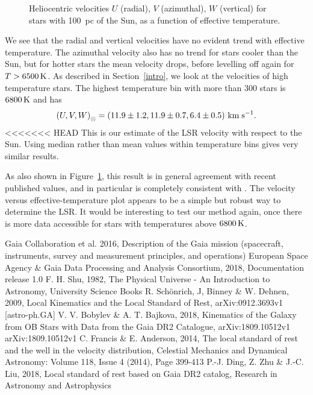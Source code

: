 \documentclass{aastex62}
\begin{document}
	\begin{figure}[ht!]
	\caption{Heliocentric velocities $U$ (radial), $V$ (azimuthal), $W$ (vertical) for stars with 100~pc of the Sun, as a function of effective temperature.\label{fig:lsrmean}}
	\end{figure}

We see that the radial and vertical velocities have no evident trend with effective temperature.  The azimuthal velocity also has no trend for stars cooler than the Sun, but for hotter stars the mean velocity drops, before levelling off again for $T>6500\rm\,K$.  As described in Section~\ref{intro}, we look at the velocities of high temperature stars. The highest temperature bin with more than 300 stars is $6800\rm\,K$ and has
$$ \left( U, V, W\right)_\odot=\left( 11.9\pm1.2, 11.9\pm0.7, 6.4\pm0.5 \right) \rm\,km\;s^{-1}.$$
<<<<<<< HEAD
This is our estimate of the LSR velocity with respect to the Sun.  Using median rather than mean values within temperature bins gives very similar results.

As also shown in Figure~\ref{fig:lsrmean}, this result is in general agreement with recent published values, and in particular is completely consistent with \cite{schoenrich}.  The velocity versus effective-temperature plot appears to be
a simple but robust way to determine the LSR. It would be interesting to test our method again, once there is more data accessible for stars with temperatures above $6800\rm\,K$.


	\begin{thebibliography}{}
		
		 Gaia Collaboration et al. 2016, Description of the Gaia mission (spacecraft, instruments, survey and measurement principles, and operations)
		 European Space Agency \& Gaia Data Processing and Analysis Consortium, 2018, Documentation release 1.0
		 F. H. Shu, 1982, The Physical Universe - An Introduction to Astronomy, University Science Books
		 R. Sch\"{o}nrich, J, Binney \& W. Dehnen, 2009, Local Kinematics and the Local Standard of Rest, arXiv:0912.3693v1 [astro-ph.GA]
		 V. V. Bobylev \& A. T. Bajkova, 2018, Kinematics of the Galaxy from OB Stars with Data from the Gaia DR2 Catalogue, arXiv:1809.10512v1 arXiv:1809.10512v1
		 C. Francis \& E. Anderson, 2014, The local standard of rest and the well in the velocity distribution, Celestial Mechanics and Dynamical Astronomy: Volume 118, Issue 4 (2014), Page 399-413
		 P.-J. Ding, Z. Zhu \& J.-C. Liu, 2018, Local standard of rest based on Gaia DR2 catalog, Research in Astronomy and Astrophysics
		
	\end{thebibliography}
	
\end{document}
